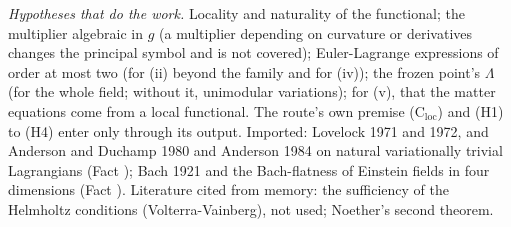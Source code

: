 \emph{Hypotheses that do the work.} Locality and naturality of the functional; the multiplier algebraic in $g$ (a multiplier depending on curvature or derivatives changes the principal symbol and is not covered); Euler-Lagrange expressions of order at most two (for (ii) beyond the family and for (iv)); the frozen point's $\Lambda$ (for the whole field; without it, unimodular variations); for (v), that the matter equations come from a local functional. The route's own premise (C$_{\mathrm{loc}}$) and (H1) to (H4) enter only through its output. Imported: Lovelock 1971 and 1972, and Anderson and Duchamp 1980 and Anderson 1984 on natural variationally trivial Lagrangians (Fact ); Bach 1921 and the Bach-flatness of Einstein fields in four dimensions (Fact ). Literature cited from memory: the sufficiency of the Helmholtz conditions (Volterra-Vainberg), not used; Noether's second theorem.
